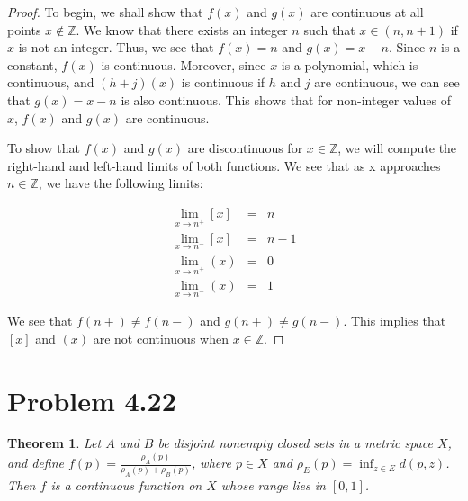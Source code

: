 \documentclass[psamsfonts]{amsart}
\newtheorem{thm}{Theorem}[section]
\theoremstyle{definition}
\theoremstyle{remark}
\numberwithin{equation}{section}
\begin{document}
\begin{proof}
To begin, we shall show that $f(x)$ and $g(x)$ are continuous at all points $x \notin \mathbb{Z}$. We know that there exists an integer $n$ such that $x \in (n, n+1)$ if $x$ is not an integer. Thus, we see that $f(x) = n$ and $g(x) = x - n$. Since $n$ is a constant, $f(x)$ is continuous. Moreover, since $x$ is a polynomial, which is continuous, and $(h + j)(x)$ is continuous if $h$ and $j$ are continuous, we can see that $g(x) = x - n$ is also continuous. This shows that for non-integer values of $x$, $f(x)$ and $g(x)$ are continuous.

To show that $f(x)$ and $g(x)$ are discontinuous for $x \in \mathbb{Z}$, we will compute the right-hand and left-hand limits of both functions. We see that as x approaches $n \in \mathbb{Z}$, we have the following limits:

\begin{eqnarray}
\lim_{x \to n^{+}} [x] &=& n \\
\lim_{x \to n^{-}} [x] &=& n - 1 \\
\lim_{x \to n^{+}} (x) &=& 0 \\
\lim_{x \to n^{-}} (x) &=& 1
\end{eqnarray}

We see that $f(n+) \neq f(n-)$ and $g(n+) \neq g(n-)$. This implies that $[x]$ and $(x)$ are not continuous when $x \in \mathbb{Z}$. 
\end{proof}

\section{Problem 4.22}

\begin{thm}
Let $A$ and $B$ be disjoint nonempty closed sets in a metric space $X$, and define $f(p) = \frac{\rho_A(p)}{\rho_A(p) + \rho_B(p)}$, where $p \in X$ and $\rho_E(p) = \inf_{z \in E} d(p,z)$. Then $f$ is a continuous function on $X$ whose range lies in $[0,1]$. 
\end{thm}
\end{document}
